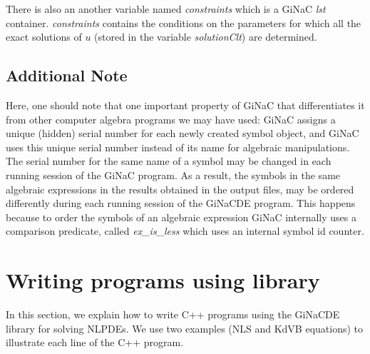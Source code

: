 \documentclass[prd,aps,floats,showkeys,nofootinbib,notitlepage]{revtex4-2}
\begin{document}
	There is also an another variable named {\em constraints} which is a GiNaC {\em lst} container. {\em constraints} contains the conditions on the parameters for which all the exact solutions of $u$ (stored in the variable {\em solutionClt}) are determined.
	
	\subsection{Additional Note}
	Here, one should note that one important property of GiNaC that differentiates it from other computer algebra programs we may have used: GiNaC assigns a unique (hidden) serial number for each newly created symbol object, and GiNaC uses this unique serial number instead of its name for algebraic manipulations. The serial number for the same name of a symbol may be changed in each running session of the GiNaC program. As a result, the symbols in the same algebraic expressions in the results obtained in the output files, may be ordered differently during each running session of the GiNaCDE program. This happens because to order the symbols of an algebraic expression GiNaC internally uses a comparison predicate, called {\em ex\_is\_less} which uses an internal symbol id counter.	
	\section{Writing programs using library}\label{sec:examples} 
	In this section, we explain how to write C++ programs using the GiNaCDE library for solving NLPDEs. We use two examples (NLS and KdVB equations) to illustrate each line of the C++ program.
\end{document}
